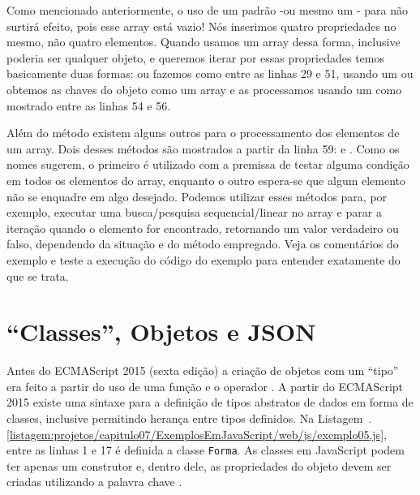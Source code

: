 Como mencionado anteriormente, o uso de um  padrão -ou mesmo um - para  não surtirá efeito, pois esse array está vazio! Nós inserimos quatro propriedades no mesmo, não quatro elementos. Quando usamos um array dessa forma, inclusive poderia ser qualquer objeto, e queremos iterar por essas propriedades temos basicamente duas formas: ou fazemos como entre as linhas 29 e 51, usando um  ou obtemos as chaves do objeto como um array e as processamos usando um  como mostrado entre as linhas 54 e 56.

Além do método  existem alguns outros para o processamento dos elementos de um array. Dois desses métodos são mostrados a partir da linha 59:  e . Como os nomes sugerem, o primeiro é utilizado com a premissa de testar alguma condição em todos os elementos do array, enquanto o outro espera-se que algum elemento não se enquadre em algo desejado. Podemos utilizar esses métodos para, por exemplo, executar uma busca/pesquisa sequencial/linear no array e parar a iteração quando o elemento for encontrado, retornando um valor verdadeiro ou falso, dependendo da situação e do método empregado. Veja os comentários do exemplo e teste a execução do código do exemplo para entender exatamente do que se trata.



\section{``Classes'', Objetos e JSON}

Antes do ECMAScript 2015 (sexta edição) a criação de objetos com um ``tipo'' era feito a partir do uso de uma função e o operador . A partir do ECMAScript 2015 existe uma sintaxe para a definição de tipos abstratos de dados em forma de classes, inclusive permitindo herança entre tipos definidos. Na Listagem~\thechapter.\ref{listagem:projetos/capitulo07/ExemplosEmJavaScript/web/js/exemplo05.js}, entre as linhas 1 e 17 é definida a classe \texttt{Forma}. As classes em JavaScript podem ter apenas um construtor e, dentro dele, as propriedades do objeto devem ser criadas utilizando a palavra chave .


